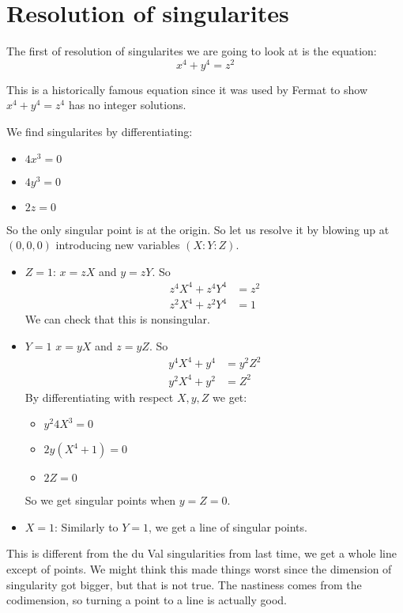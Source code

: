 \section{Resolution of singularites}
\begin{example}
    The first of resolution of singularites we are going to look at is the equation:
    \[x^4+y^4=z^2\]
    \begin{remark}
        This is a historically famous equation since it was used by Fermat to show $x^4+y^4=z^4$ has no integer solutions.    
    \end{remark}
    We find singularites by differentiating:\begin{itemize}
        \item $4x^3 = 0$
        \item $4y^3=0$
        \item $2z=0$
    \end{itemize}
    So the only singular point is at the origin. So let us resolve it by blowing up at $(0,0,0)$ introducing new variables $(X\colon Y\colon Z)$.\begin{itemize}
        \item $Z=1$: $x=zX$ and $y=zY$. So\begin{align*}
            z^4X^4+z^4Y^4&=z^2\\
            z^2X^4+z^2Y^4&=1
        \end{align*} We can check that this is nonsingular.
        \item $Y=1$ $x=yX$ and $z=yZ$.  So\begin{align*}
            y^4X^4+y^4&=y^2Z^2\\
            y^2X^4+y^2&=Z^2
        \end{align*}
        By differentiating with respect $X,y,Z$ we get:\begin{itemize}
            \item $y^2 4X^3 = 0$
            \item $2y(X^4+1) = 0$
            \item $2Z=0$
        \end{itemize} So we get singular points when $y=Z=0$.
        \item $X=1$: Similarly to $Y=1$, we get a line of singular points.
    \end{itemize}
    This is different from the du Val singularities from last time, we get a whole line except of points. We might think this made things worst since the dimension of singularity got bigger, but that is not true.
    The nastiness comes from the codimension, so turning a point to a line is actually good.
    

\end{example}
